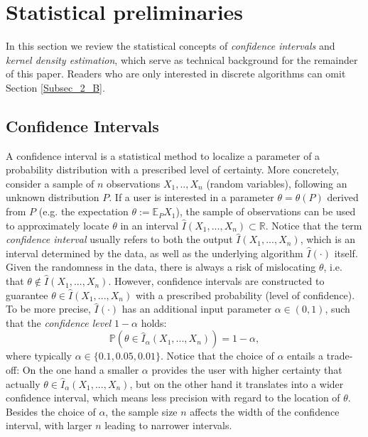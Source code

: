 \documentclass[conference]{IEEEtran}
\begin{document}
\section{Statistical preliminaries}

In this section we review the statistical concepts of \textit{confidence intervals} and \textit{kernel density estimation}, which serve as technical background for the remainder of this paper. Readers who are only interested in discrete algorithms can omit Section \ref{Subsec_2_B}. 

\subsection{Confidence Intervals} \label{Subsec_2_A}

A confidence interval is a statistical method to localize a parameter of a probability distribution with a prescribed level of certainty. More concretely, consider a sample of $n$  observations $X_1,..,X_n$ (random variables),  following an unknown distribution $P$. If a user is interested in a parameter $\theta  = \theta(P)$ derived from $P$ (e.g. the expectation $\theta:=\mathbb{E}_P X_1$), the sample of observations can be used to approximately locate $\theta$ in an interval $\hat I(X_1,...,X_n) \subset \mathbb{R}$. Notice that the term \textit{confidence interval} usually refers to both the output $\hat I(X_1,...,X_n)$, which is an interval  determined by the data, as well as the underlying algorithm $\hat I (\cdot)$ itself. Given the randomness in the data, there is always a risk of mislocating $\theta$, i.e. that $\theta \not \in \hat I(X_1,...,X_n)$. However, confidence intervals are constructed to guarantee $\theta \in \hat I(X_1,...,X_n)$ with a prescribed probability (level of confidence). To be more precise, $\hat I(\cdot )$ has an additional input parameter $\alpha \in (0,1)$, such that the \textit{confidence level} $1-\alpha$ holds:
\begin{equation} \label{Eq_def_conf_int}
\mathbb{P}(\theta   \in \hat I_\alpha(X_1,...,X_n)) =1- \alpha,
\end{equation}
 where typically $\alpha \in \{0.1, 0.05, 0.01\}$. Notice that the choice of $\alpha$ entails a trade-off: On the one hand a smaller $\alpha$ provides the user with higher certainty that actually $\theta  \in \hat I_\alpha(X_1,...,X_n)$, but on the other hand it translates into a wider confidence interval, which means less precision with regard to the location of $\theta$. Besides the choice of $\alpha$, the sample size $n$ affects the width of the confidence interval, with larger $n$ leading to narrower intervals.\\
\end{document}
